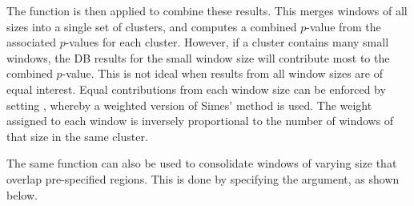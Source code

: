 \documentclass{report}\usepackage[]{graphicx}\usepackage[usenames,dvipsnames]{color}
\newcommand{\hlnum}[1]{\textcolor[rgb]{0.816,0.125,0.439}{#1}}%
\newcommand{\hlopt}[1]{\textcolor[rgb]{0,0,0}{#1}}%
\newcommand{\hlstd}[1]{\textcolor[rgb]{0.251,0.251,0.251}{#1}}%
\newcommand{\hlkwb}[1]{\textcolor[rgb]{0,0,0}{#1}}%
\newcommand{\hlkwc}[1]{\textcolor[rgb]{0.251,0.251,0.251}{#1}}%
\newcommand{\hlkwd}[1]{\textcolor[rgb]{0.878,0.439,0.125}{#1}}%
\newenvironment{knitrout}{}{} %
\begin{document}
The  function is then applied to combine these results.
This merges windows of all sizes into a single set of clusters, and computes a combined $p$-value from the associated $p$-values for each cluster.
However, if a cluster contains many small windows, the DB results for the small window size will contribute most to the combined $p$-value.
This is not ideal when results from all window sizes are of equal interest.
Equal contributions from each window size can be enforced by setting , whereby a weighted version of Simes' method \cite{benjamini1997} is used.
The weight assigned to each window is inversely proportional to the number of windows of that size in the same cluster.

\begin{knitrout}
\color{fgcolor}
\end{knitrout}

The same function can also be used to consolidate windows of varying size that overlap pre-specified regions.
This is done by specifying the  argument, as shown below.
\end{document}
